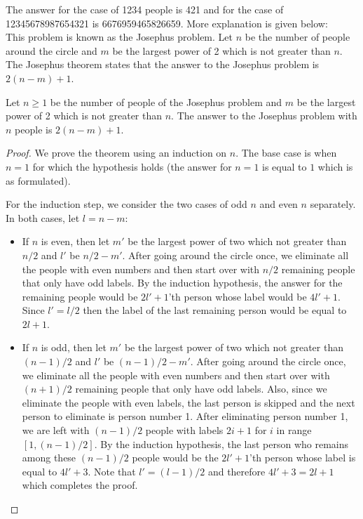 \begin{solution}
The answer for the case of 1234 people is 421 and for the case of 12345678987654321 is 6676959465826659. More explanation is given below:\\[0.2cm]

This problem is known as the Josephus problem. Let $n$ be the number of people around the circle and $m$ be the largest power of 2 which is not greater than $n$. The Josephus theorem states that the answer to the Josephus problem is $2(n-m)+1$.

\begin{theorem}
	Let $n \geq 1$ be the number of people of the Josephus problem and $m$ be the largest power of 2 which is not greater than $n$. The answer to the Josephus problem with $n$ people is $2(n-m)+1$.
\end{theorem}
\begin{proof}
	We prove the theorem using an induction on $n$. The base case is when $n=1$ for which the hypothesis holds (the answer for $n=1$ is equal to $1$ which is as formulated).
	
	For the induction step, we consider the two cases of odd $n$ and even $n$ separately. In both cases, let $l = n-m$:
	\begin{itemize}
	\item If $n$ is even, then let $m'$ be  the largest power of two which not greater than $n/2$ and $l'$ be $n/2 - m'$. After going around the circle once, we eliminate all the people with even numbers and then start over with $n/2$ remaining people that only have odd labels. By the induction hypothesis, the answer for the remaining people would be $2l'+1$'th person whose label would be $4l'+1$. Since $l' = l/2$ then the label of the last remaining person would be equal to $2l+1$.
	
	\item If $n$ is odd, then let $m'$ be  the largest power of two which not greater than $(n-1)/2$ and $l'$ be $(n-1)/2 - m'$. After going around the circle once, we eliminate all the people with even numbers and then start over with $(n+1)/2$ remaining people that only have odd labels. Also, since we eliminate the people with even labels, the last person is skipped and the next person to eliminate is person number 1. After eliminating person number 1, we are left with $(n-1)/2$ people with labels $2i+1$ for $i$ in range $[1, (n-1)/2]$. By the induction hypothesis, the last person who remains among these $(n-1)/2$ people would be the $2l'+1$'th person whose label is equal to $4l'+3$.  Note that $l' = (l-1)/2$ and therefore $4l'+3 = 2l+1$ which completes the proof.
	\end{itemize}
\end{proof}
\end{solution}
